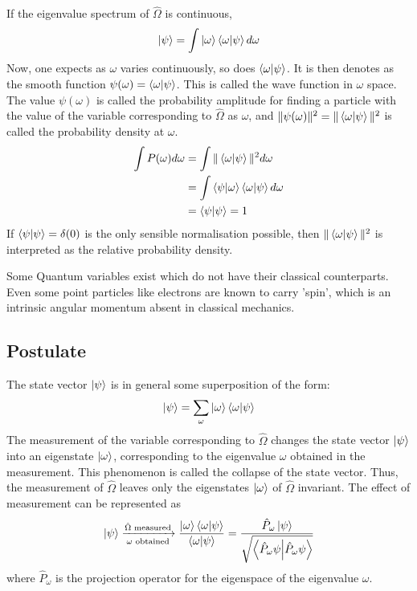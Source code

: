 \documentclass[12pt,a4paper]{report}
\newcommand{\rom}[1]{\Romannum{#1}}
\begin{document}
If the eigenvalue spectrum of $\hat{\Omega}$ is continuous,
\begin{equation*}
    \ket{\psi} = \int \ket{\omega}\bra{\omega}\ket{\psi} d\omega
\end{equation*}
Now, one expects as $\omega$ varies continuously, so does $\bra{\omega}\ket{\psi}$. It is then denotes as the smooth function $\psi(\omega) = \bra{\omega}\ket{\psi}$. This is called the wave function in $\omega$ space.
The value $\psi(\omega)$ is called the probability amplitude for finding a particle with the value of the variable corresponding to $\hat{\Omega}$ as $\omega$, and $\|\psi(\omega)\|^2 = \|\bra{\omega}\ket{\psi}\|^2$ is called
the probability density at $\omega$.
\begin{align*}
    \int P(\omega) d\omega &= \int \| \bra{\omega}\ket{\psi} \|^2 d\omega \\
    &= \int \bra{\psi}\ket{\omega}\bra{\omega}\ket{\psi} d\omega \\
    &= \bra{\psi}\ket{\psi} = 1 \\
\end{align*}
If $\bra{\psi}\ket{\psi} = \delta(0)$ is the only sensible normalisation possible, then $\| \bra{\omega}\ket{\psi} \|^2$ is interpreted as the relative probability density.

Some Quantum variables exist which do not have their classical counterparts. Even some point particles like electrons are known to carry 'spin', which is an intrinsic angular momentum
absent in classical mechanics.

\newpage

\subsection{Postulate \rom{3}}

The state vector $\ket{\psi}$ is in general some superposition of the form:
\begin{equation*}
    \ket{\psi} = \sum_\omega \ket{\omega}\bra{\omega}\ket{\psi}
\end{equation*}
The measurement of the variable corresponding to $\hat{\Omega}$ changes the state vector $\ket{\psi}$ into an eigenstate $\ket{\omega}$, corresponding to the eigenvalue $\omega$ obtained in the measurement.
This phenomenon is called the collapse of the state vector. Thus, the measurement of $\hat{\Omega}$ leaves only the eigenstates $\ket{\omega}$ of $\hat{\Omega}$ invariant. The effect of measurement can be represented as
\begin{equation*}
    \ket{\psi} \xrightarrow[\omega \text{ obtained}]{\hat{\Omega} \text{ measured}} \frac{\ket{\omega} \bra{\omega}\ket{\psi}}{\bra{\omega}\ket{\psi}} = \frac{\hat{P}_\omega\ket{\psi}}{\sqrt{\bra{\hat{P}_\omega\psi}\ket{\hat{P}_\omega\psi}}}
\end{equation*}
where $\hat{P}_\omega$ is the projection operator for the eigenspace of the eigenvalue $\omega$.
\end{document}
